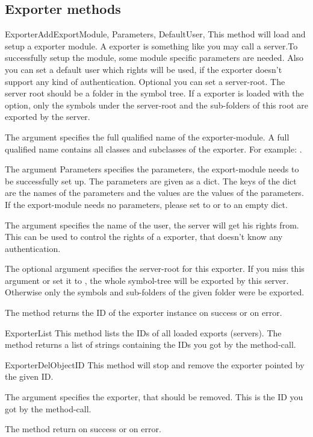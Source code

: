 \subsection{Exporter methods}
\begin{methoddesc}[Core]{ExporterAdd}{ExportModule, Parameters, DefaultUser, }
This method will load and setup a exporter module. A exporter is something like
you may call a server.To successfully setup the module, some module specific 
parameters are needed. Also you can set a default user which rights will be 
used, if the exporter doesn't support any kind of authentication. Optional you can set 
a server-root. The server root should be a folder in the symbol tree. If a exporter 
is loaded with the  option, only the symbols under the server-root 
and the sub-folders of this root are exported by the server.

The argument  specifies the full qualified name of the 
exporter-module. A full qualified name contains all classes and subclasses of 
the exporter. For example: . 

The argument Parameters specifies the parameters, the export-module needs to be
successfully set up. The parameters are given as a dict. The keys of the dict
are the names of the parameters and the values are the values of the 
parameters. If the export-module needs no parameters, please set 
 to  or to an empty dict.

The argument  specifies the name of the user, the server will 
get his rights from. This can be used to control the rights of a exporter,
that doesn't know any authentication.

The optional argument  specifies the server-root for this exporter. 
If you miss this argument or set it to , the whole symbol-tree
will be exported by this server. Otherwise only the symbols and sub-folders of
the given folder were be exported.

The method returns the ID of the exporter instance on success or 
on error.
\end{methoddesc}


\begin{methoddesc}[Core]{ExporterList}{}
This method lists the IDs of all loaded exports (servers). The method returns
a list of strings containing the IDs you got by the 
method-call. 
\end{methoddesc}


\begin{methoddesc}[Core]{ExporterDel}{ObjectID}
This method will stop and remove the exporter pointed by the given ID. 

The argument  specifies the exporter, that should be removed.
This is the ID you got by the  method-call.

The method return  on success or  on error.
\end{methoddesc}
